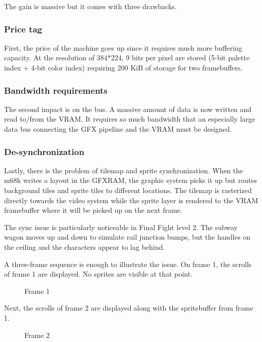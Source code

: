 The gain is massive but it comes with three drawbacks. 

\subsubsection{Price tag}
First, the price of the machine goes up since it requires much more buffering capacity. At the resolution of 384*224, 9 bits per pixel are stored (5-bit palette index + 4-bit color index) requiring 200 KiB of storage for two framebuffers.

\subsubsection{Bandwidth requirements}
The second impact is on the bus. A massive amount of data is now written and read to/from the VRAM. It requires so much bandwidth that an especially large data bus connecting the GFX pipeline and the VRAM must be designed.

\subsubsection{De-synchronization}
Lastly, there is the problem of tilemap and sprite synchronization. When the m68k writes a layout in the GFXRAM, the graphic system picks it up but routes background tiles and sprite tiles to different locations. The tilemap is rasterized directly towards the video system while the sprite layer is rendered to the VRAM framebuffer where it will be picked up on the next frame.
 

\begin{trivia}
The sync issue is particularly noticeable in Final Fight level 2. The subway wagon moves up and down to simulate rail junction bumps, but the handles on the ceiling and the characters appear to lag behind.
\end{trivia}

A three-frame sequence is enough to illustrate the issue. On frame 1, the scrolls of frame 1 are displayed. No sprites are visible at that point.

\begin{figure}[H]
 \caption*{Frame 1}%
 \end{figure}%

Next, the scrolls of frame 2 are displayed along with the spritebuffer from frame 1.
 

\begin{figure}[H]
 \caption*{Frame 2}%
 \end{figure}%


